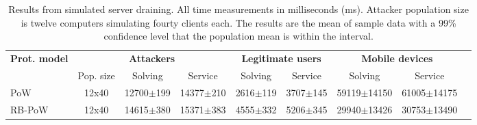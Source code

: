   \begin{table}[H]
    \centering
    \tiny
    \caption{Results from simulated server draining. All time measurements in milliseconds (ms). Attacker population size is twelve computers simulating fourty clients each.  The results are the mean of sample data with a 99\% confidence level that the population mean is within the interval.}\label{tab:draining}

    \begin{tabularx}{1.05\textwidth}{lcccccccr} \toprule
      \multicolumn{1}{c}{\textbf{Prot. model}} & \multicolumn{3}{c}{\textbf{Attackers}} & \multicolumn{2}{c}{\textbf{Legitimate users}} & \multicolumn{2}{c}{\textbf{Mobile devices}} \\
      \multicolumn{1}{c}{} & \multicolumn{1}{c}{Pop. size} & \multicolumn{1}{c}{Solving} & \multicolumn{1}{c}{Service} & \multicolumn{1}{c}{Solving} & \multicolumn{1}{c}{Service} & \multicolumn{1}{c}{Solving} & \multicolumn{1}{c}{Service}  \\ \toprule
      PoW &  12x40  & 12700$\pm$199 & 14377$\pm$210 & 2616$\pm$119 & 3707$\pm$145 & 59119$\pm$14150 & 61005$\pm$14175    \\
      RB-PoW & 12x40 & 14615$\pm$380 & 15371$\pm$383 & 4555$\pm$332 & 5206$\pm$345 & 29940$\pm$13426 & 30753$\pm$13490   \\ \bottomrule
    \end{tabularx}
  \end{table}
